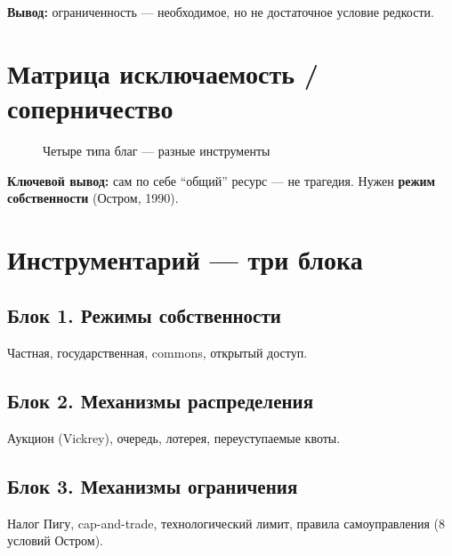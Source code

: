 \documentclass[12pt]{article}
\begin{document}
\textbf{Вывод:} ограниченность --- необходимое, но не достаточное условие редкости.

\section{Матрица исключаемость / соперничество}

\begin{figure}[h]
\centering
{}
\caption{Четыре типа благ --- разные инструменты}
\end{figure}

\textbf{Ключевой вывод:} сам по себе ``общий'' ресурс --- не трагедия. Нужен \textbf{режим собственности} (Остром, 1990).

\section{Инструментарий --- три блока}

\subsection{Блок 1. Режимы собственности}
Частная, государственная, commons, открытый доступ.

\subsection{Блок 2. Механизмы распределения}
Аукцион (Vickrey), очередь, лотерея, переуступаемые квоты.

\subsection{Блок 3. Механизмы ограничения}
Налог Пигу, cap-and-trade, технологический лимит, правила самоуправления (8 условий Остром).
\end{document}
